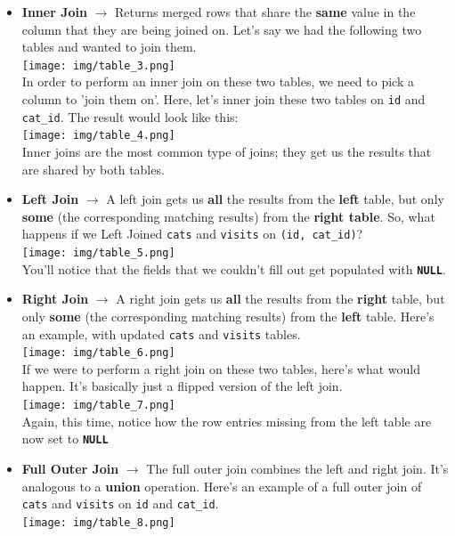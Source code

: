 \documentclass[english, 10pt]{article}
\begin{document}
\begin{itemize}
	\item \textbf{Inner Join} $\rightarrow$ Returns merged rows that share the \textbf{same} value in the column that they are being joined on. Let's say we had the following two tables and wanted to join them.\\
	
	\texttt{[image: img/table\_3.png]}\\
	
	In order to perform an inner join on these two tables, we need to pick a column to 'join them on'. Here, let's inner join these two tables on \texttt{id} and \texttt{cat\_id}. The result would look like this:\\
	
	\texttt{[image: img/table\_4.png]}\\
	
	Inner joins are the most common type of joins; they get us the results that are shared by both tables.
	
	\item \textbf{Left Join} $\rightarrow$ A left join gets us \textbf{all} the results from the \textbf{left} table, but only \textbf{some} (the corresponding matching results) from the \textbf{right table}. So, what happens if we Left Joined \texttt{cats} and \texttt{visits} on \texttt{(id, cat\_id)}?\\
	
	\texttt{[image: img/table\_5.png]}\\
	
	You'll notice that the fields that we couldn't fill out get populated with \textbf{\texttt{NULL}}.
	
	\item \textbf{Right Join} $\rightarrow$ A right join gets us \textbf{all} the results from the \textbf{right} table, but only \textbf{some} (the corresponding matching results) from the \textbf{left} table. Here's an example, with updated \texttt{cats} and \texttt{visits} tables.\\
	
	\texttt{[image: img/table\_6.png]}\\
	
	If we were to perform a right join on these two tables, here's what would happen. It's basically just a flipped version of the left join.\\
	
	\texttt{[image: img/table\_7.png]}\\
	
	Again, this time, notice how the row entries missing from the left table are now set to \texttt{\textbf{NULL}}
	
	\item \textbf{Full Outer Join} $\rightarrow$ The full outer join combines the left and right join. It's analogous to a \textbf{union} operation. Here's an example of a full outer join of \texttt{cats} and \texttt{visits} on \texttt{id} and \texttt{cat\_id}.\\
	
	\texttt{[image: img/table\_8.png]}\\
	
\end{itemize}
\end{document}
